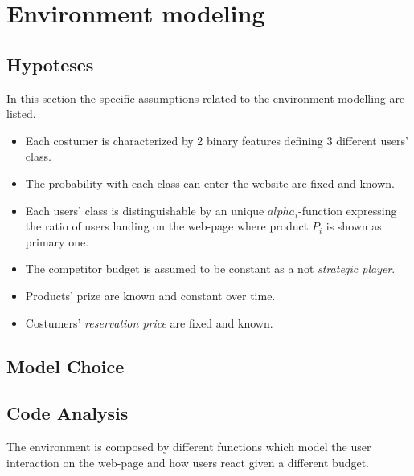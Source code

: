 

\chapter{Environment modeling}
\label{chap:env_model}

\section{Hypoteses}
\label{sec_hypoteses}

In this section the specific assumptions related to the environment modelling are listed.

\begin{itemize}
    \item Each costumer is characterized by 2 binary features defining 3 different users' class.
    
    \item The probability with each class can enter the website are fixed and known.
    
    \item Each users' class is distinguishable by an unique $alpha_i$-function expressing the ratio of users landing on the web-page where product $P_i$ is shown as              primary one.
    
    \item The competitor budget is assumed to be constant as a not \textit{strategic player}.
    
    \item Products' prize are known and constant over time.
    
    \item Costumers' \textit{reservation price} are fixed and known.
 \end{itemize}

\section{Model Choice}
\label{sec_Motivation}

\section{Code Analysis}
\label{sec_Code Analysis}

The environment is composed by different functions which model the user interaction on the web-page and how users react given a different budget.
 
